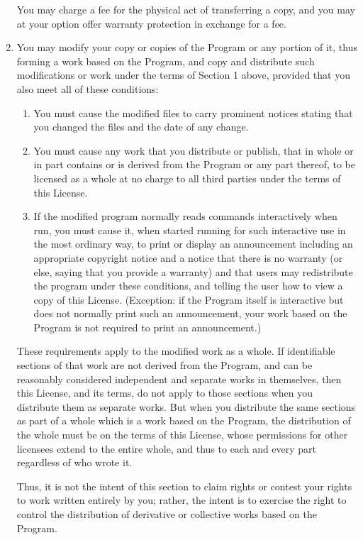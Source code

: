 \begin{enumerate}
  You may charge a fee for the physical act of transferring a copy, and you may at your option offer warranty protection in exchange for a fee.
\item
  You may modify your copy or copies of the Program or any portion of it, thus forming a work based on the Program, and copy and distribute such modifications or work under the terms of Section 1 above, provided that you also meet all of these conditions:
  \begin{enumerate}
  \item
    You must cause the modified files to carry prominent notices stating that you changed the files and the date of any change.
  \item
    You must cause any work that you distribute or publish, that in whole or in part contains or is derived from the Program or any part thereof, to be licensed as a whole at no charge to all third parties under the terms of this License.
  \item
    If the modified program normally reads commands interactively when run, you must cause it, when started running for such interactive use in the most ordinary way, to print or display an announcement including an appropriate copyright notice and a notice that there is no warranty (or else, saying that you provide a warranty) and that users may redistribute the program under these conditions, and telling the user how to view a copy of this License. (Exception: if the Program itself is interactive but does not normally print such an announcement, your work based on the Program is not required to print an announcement.)
  \end{enumerate}

  These requirements apply to the modified work as a whole. If identifiable sections of that work are not derived from the Program, and can be reasonably considered independent and separate works in themselves, then this License, and its terms, do not apply to those sections when you distribute them as separate works. But when you distribute the same sections as part of a whole which is a work based on the Program, the distribution of the whole must be on the terms of this License, whose permissions for other licensees extend to the entire whole, and thus to each and every part regardless of who wrote it.

  Thus, it is not the intent of this section to claim rights or contest your rights to work written entirely by you; rather, the intent is to exercise the right to control the distribution of derivative or collective works based on the Program.


\end{enumerate}
